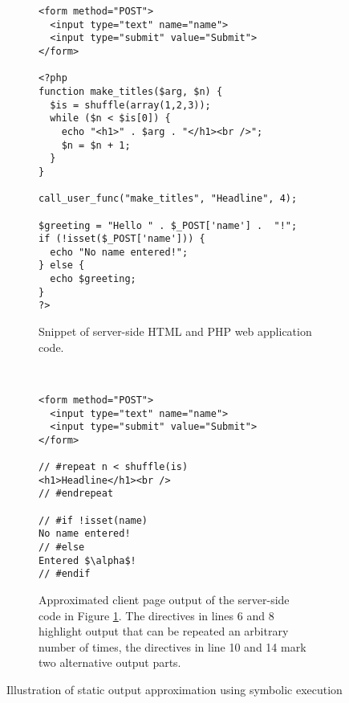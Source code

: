 \documentclass[sigconf]{acmart}
\begin{document}
\begin{figure}[t]
	\centering
	\begin{subfigure}[center]{0.48\textwidth}%
\begin{lstlisting}
<form method="POST">
  <input type="text" name="name">
  <input type="submit" value="Submit">
</form>

<?php
function make_titles($arg, $n) {
  $is = shuffle(array(1,2,3));
  while ($n < $is[0]) {
    echo "<h1>" . $arg . "</h1><br />";
    $n = $n + 1;
  }
}
  
call_user_func("make_titles", "Headline", 4);

$greeting = "Hello " . $_POST['name'] .  "!";
if (!isset($_POST['name'])) {
  echo "No name entered!";
} else {
  echo $greeting;
}
?>
\end{lstlisting}
		\caption{Snippet of server-side HTML and PHP web application code.
		\label{fig:web_application}}
    \end{subfigure}

	\vspace{2mm}    
    
    ~ %
    \begin{subfigure}[center]{0.48\textwidth}
\begin{lstlisting}[mathescape]
<form method="POST">
  <input type="text" name="name">
  <input type="submit" value="Submit">
</form>

// #repeat n < shuffle(is)
<h1>Headline</h1><br />
// #endrepeat

// #if !isset(name)
No name entered!
// #else
Entered $\alpha$!
// #endif

\end{lstlisting}
		\caption{
			Approximated client page output of the server-side code in Figure
			\ref{fig:web_application}. The directives in lines 6 and 8 highlight output
			that can be repeated an arbitrary number of times, the directives in line 10
			and 14 mark two alternative output parts.
			\label{fig:output_example}
		}
    \end{subfigure}
    \vspace{2mm}
    \caption{
    	Illustration of static output approximation using symbolic
    	execution
    	\label{fig:code_example}
    }
\end{figure}
\end{document}
